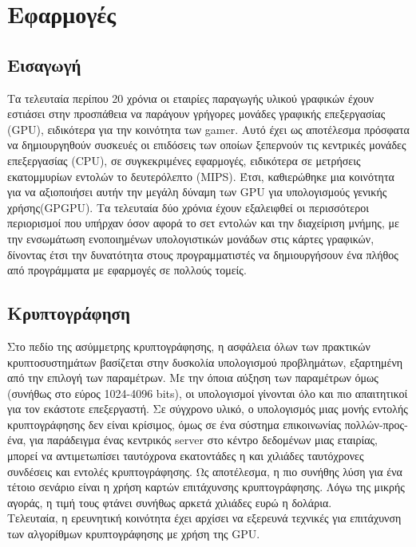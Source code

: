 \chapter{Εφαρμογές}
\section{Εισαγωγή}
Τα τελευταία περίπου 20 χρόνια οι εταιρίες παραγωγής υλικού γραφικών έχουν εστιάσει στην προσπάθεια να παράγουν γρήγορες μονάδες γραφικής επεξεργασίας (GPU), ειδικότερα για την κοινότητα των gamer. Αυτό έχει ως αποτέλεσμα πρόσφατα να δημιουργηθούν συσκευές οι επιδόσεις των οποίων ξεπερνούν τις κεντρικές μονάδες επεξεργασίας (CPU), σε συγκεκριμένες εφαρμογές, ειδικότερα σε μετρήσεις εκατομμυρίων εντολών το δευτερόλεπτο (MIPS). Έτσι, καθιερώθηκε μια κοινότητα για να αξιοποιήσει αυτήν την μεγάλη δύναμη των GPU για υπολογισμούς γενικής χρήσης(GPGPU). Τα τελευταία δύο χρόνια έχουν εξαλειφθεί οι περισσότεροι περιορισμοί που υπήρχαν όσον αφορά το σετ εντολών και την διαχείριση μνήμης, με την ενσωμάτωση ενοποιημένων υπολογιστικών μονάδων στις κάρτες γραφικών, δίνοντας έτσι την δυνατότητα στους προγραμματιστές να δημιουργήσουν ένα πλήθος από προγράμματα με εφαρμογές σε πολλούς τομείς.
\section{Κρυπτογράφηση}
Στο πεδίο της ασύμμετρης κρυπτογράφησης, η ασφάλεια όλων των πρακτικών κρυπτοσυστημάτων βασίζεται στην δυσκολία υπολογισμού προβλημάτων, εξαρτημένη από την επιλογή των παραμέτρων. Με την όποια αύξηση των παραμέτρων όμως (συνήθως στο εύρος 1024-4096 bits), οι υπολογισμοί γίνονται όλο και πιο απαιτητικοί για τον εκάστοτε επεξεργαστή. Σε σύγχρονο υλικό, ο υπολογισμός μιας μονής εντολής κρυπτογράφησης δεν είναι κρίσιμος, όμως σε ένα σύστημα επικοινωνίας πολλών-προς-ένα, για παράδειγμα ένας κεντρικός server στο κέντρο δεδομένων μιας εταιρίας, μπορεί να αντιμετωπίσει ταυτόχρονα εκατοντάδες η και χιλιάδες ταυτόχρονες συνδέσεις και εντολές κρυπτογράφησης. Ως αποτέλεσμα, η πιο συνήθης λύση για ένα τέτοιο σενάριο είναι η χρήση καρτών επιτάχυνσης κρυπτογράφησης. Λόγω της μικρής αγοράς, η τιμή τους φτάνει συνήθως αρκετά χιλιάδες ευρώ η δολάρια.\\
Τελευταία, η ερευνητική κοινότητα έχει αρχίσει να εξερευνά τεχνικές για επιτάχυνση των αλγορίθμων κρυπτογράφησης με χρήση της GPU.  
